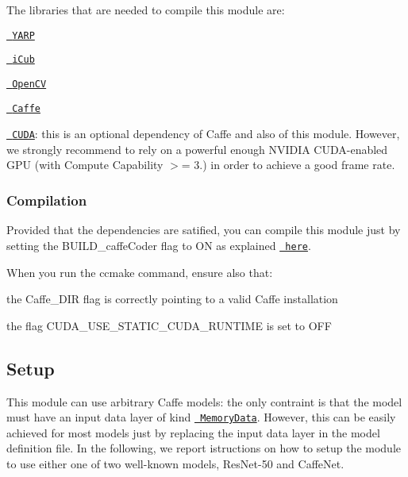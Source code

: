 The libraries that are needed to compile this module are\+:


\begin{DoxyItemize}
\item \href{https://github.com/robotology/yarp}{\texttt{ Y\+A\+RP}}
\item \href{https://github.com/robotology/icub-main}{\texttt{ i\+Cub}}
\item \href{http://opencv.org/releases.html}{\texttt{ Open\+CV}}
\item \href{https://www.github.com/BVLC/caffe.git}{\texttt{ Caffe}}
\item \href{https://developer.nvidia.com/cuda-zone}{\texttt{ C\+U\+DA}}\+: this is an optional dependency of Caffe and also of this module. However, we strongly recommend to rely on a powerful enough N\+V\+I\+D\+IA C\+U\+D\+A-\/enabled G\+PU (with Compute Capability $>$= 3.) in order to achieve a good frame rate.
\end{DoxyItemize}

\subsubsection*{Compilation}

Provided that the dependencies are satified, you can compile this module just by setting the {\ttfamily B\+U\+I\+L\+D\+\_\+caffe\+Coder} flag to {\ttfamily ON} as explained \href{https://www.github.com/robotology/himrep\#compilation}{\texttt{ here}}.

When you run the {\ttfamily ccmake} command, ensure also that\+:


\begin{DoxyItemize}
\item the {\ttfamily Caffe\+\_\+\+D\+IR} flag is correctly pointing to a valid Caffe installation
\item the flag {\ttfamily C\+U\+D\+A\+\_\+\+U\+S\+E\+\_\+\+S\+T\+A\+T\+I\+C\+\_\+\+C\+U\+D\+A\+\_\+\+R\+U\+N\+T\+I\+ME} is set to {\ttfamily O\+FF}
\end{DoxyItemize}

\subsection*{Setup}

This module can use arbitrary Caffe models\+: the only contraint is that the model must have an input data layer of kind \href{http://caffe.berkeleyvision.org/tutorial/layers/memorydata.html}{\texttt{ Memory\+Data}}. However, this can be easily achieved for most models just by replacing the input data layer in the model definition file. In the following, we report istructions on how to setup the module to use either one of two well-\/known models, {\ttfamily Res\+Net-\/50} and {\ttfamily Caffe\+Net}.

